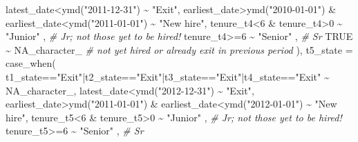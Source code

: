 \documentclass[
]{article}
\newenvironment{Shaded}{\begin{snugshade}}{\end{snugshade}}
\newcommand{\AttributeTok}[1]{\textcolor[rgb]{0.77,0.63,0.00}{#1}}
\newcommand{\CommentTok}[1]{\textcolor[rgb]{0.56,0.35,0.01}{\textit{#1}}}
\newcommand{\ConstantTok}[1]{\textcolor[rgb]{0.00,0.00,0.00}{#1}}
\newcommand{\DecValTok}[1]{\textcolor[rgb]{0.00,0.00,0.81}{#1}}
\newcommand{\FunctionTok}[1]{\textcolor[rgb]{0.00,0.00,0.00}{#1}}
\newcommand{\NormalTok}[1]{#1}
\newcommand{\SpecialCharTok}[1]{\textcolor[rgb]{0.00,0.00,0.00}{#1}}
\newcommand{\StringTok}[1]{\textcolor[rgb]{0.31,0.60,0.02}{#1}}
\begin{document}
\begin{Shaded}
\begin{Highlighting}[]
\NormalTok{      latest\_date}\SpecialCharTok{\textless{}}\FunctionTok{ymd}\NormalTok{(}\StringTok{"2011{-}12{-}31"}\NormalTok{)        }\SpecialCharTok{\textasciitilde{}} \StringTok{"Exit"}\NormalTok{,}
\NormalTok{      earliest\_date}\SpecialCharTok{\textgreater{}}\FunctionTok{ymd}\NormalTok{(}\StringTok{"2010{-}01{-}01"}\NormalTok{) }
        \SpecialCharTok{\&}\NormalTok{ earliest\_date}\SpecialCharTok{\textless{}}\FunctionTok{ymd}\NormalTok{(}\StringTok{"2011{-}01{-}01"}\NormalTok{) }\SpecialCharTok{\textasciitilde{}} \StringTok{"New hire"}\NormalTok{,}
\NormalTok{      tenure\_t4}\SpecialCharTok{\textless{}}\DecValTok{6} \SpecialCharTok{\&}\NormalTok{ tenure\_t4}\SpecialCharTok{\textgreater{}}\DecValTok{0}          \SpecialCharTok{\textasciitilde{}} \StringTok{"Junior"}\NormalTok{  , }\CommentTok{\# Jr; not those yet to be hired!}
\NormalTok{      tenure\_t4}\SpecialCharTok{\textgreater{}=}\DecValTok{6}                       \SpecialCharTok{\textasciitilde{}} \StringTok{"Senior"}\NormalTok{  , }\CommentTok{\# Sr}
      \ConstantTok{TRUE}                               \SpecialCharTok{\textasciitilde{}} \ConstantTok{NA\_character\_} \CommentTok{\# not yet hired or already exit in previous period}
\NormalTok{      ),}
    \AttributeTok{t5\_state =} \FunctionTok{case\_when}\NormalTok{(}
\NormalTok{      t1\_state}\SpecialCharTok{==}\StringTok{"Exit"}\SpecialCharTok{|}\NormalTok{t2\_state}\SpecialCharTok{==}\StringTok{"Exit"}\SpecialCharTok{|}\NormalTok{t3\_state}\SpecialCharTok{==}\StringTok{"Exit"}\SpecialCharTok{|}\NormalTok{t4\_state}\SpecialCharTok{==}\StringTok{"Exit"}                   \SpecialCharTok{\textasciitilde{}} \ConstantTok{NA\_character\_}\NormalTok{,}
\NormalTok{      latest\_date}\SpecialCharTok{\textless{}}\FunctionTok{ymd}\NormalTok{(}\StringTok{"2012{-}12{-}31"}\NormalTok{)        }\SpecialCharTok{\textasciitilde{}} \StringTok{"Exit"}\NormalTok{,}
\NormalTok{      earliest\_date}\SpecialCharTok{\textgreater{}}\FunctionTok{ymd}\NormalTok{(}\StringTok{"2011{-}01{-}01"}\NormalTok{) }
        \SpecialCharTok{\&}\NormalTok{ earliest\_date}\SpecialCharTok{\textless{}}\FunctionTok{ymd}\NormalTok{(}\StringTok{"2012{-}01{-}01"}\NormalTok{) }\SpecialCharTok{\textasciitilde{}} \StringTok{"New hire"}\NormalTok{,}
\NormalTok{      tenure\_t5}\SpecialCharTok{\textless{}}\DecValTok{6} \SpecialCharTok{\&}\NormalTok{ tenure\_t5}\SpecialCharTok{\textgreater{}}\DecValTok{0}          \SpecialCharTok{\textasciitilde{}} \StringTok{"Junior"}\NormalTok{  , }\CommentTok{\# Jr; not those yet to be hired!}
\NormalTok{      tenure\_t5}\SpecialCharTok{\textgreater{}=}\DecValTok{6}                       \SpecialCharTok{\textasciitilde{}} \StringTok{"Senior"}\NormalTok{  , }\CommentTok{\# Sr}

\end{Highlighting}
\end{Shaded}
\end{document}
